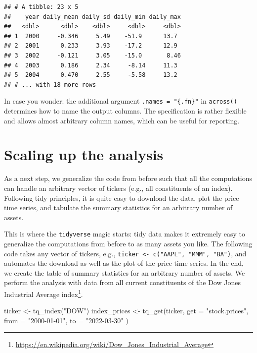 \documentclass[
]{krantz}
\newenvironment{Shaded}{\begin{snugshade}}{\end{snugshade}}
\newcommand{\AttributeTok}[1]{\textcolor[rgb]{0.61,0.61,0.61}{#1}}
\newcommand{\FunctionTok}[1]{\textcolor[rgb]{0,0,0}{#1}}
\newcommand{\NormalTok}[1]{#1}
\newcommand{\OtherTok}[1]{\textcolor[rgb]{0.37,0.37,0.37}{#1}}
\newcommand{\StringTok}[1]{\textcolor[rgb]{0.5,0.5,0.5}{#1}}
\renewcommand{\href}[2]{#2\footnote{\url{#1}}}
\begin{document}
\begin{verbatim}
## # A tibble: 23 x 5
##    year daily_mean daily_sd daily_min daily_max
##   <dbl>      <dbl>    <dbl>     <dbl>     <dbl>
## 1  2000     -0.346     5.49    -51.9      13.7 
## 2  2001      0.233     3.93    -17.2      12.9 
## 3  2002     -0.121     3.05    -15.0       8.46
## 4  2003      0.186     2.34     -8.14     11.3 
## 5  2004      0.470     2.55     -5.58     13.2 
## # ... with 18 more rows
\end{verbatim}

In case you wonder: the additional argument \texttt{.names\ =\ "\{.fn\}"} in \texttt{across()} determines how to name the output columns. The specification is rather flexible and allows almost arbitrary column names, which can be useful for reporting.

\hypertarget{scaling-up-the-analysis}{%
\section{Scaling up the analysis}\label{scaling-up-the-analysis}}

As a next step, we generalize the code from before such that all the computations can handle an arbitrary vector of tickers (e.g., all constituents of an index). Following tidy principles, it is quite easy to download the data, plot the price time series, and tabulate the summary statistics for an arbitrary number of assets.

This is where the \texttt{tidyverse} magic starts: tidy data makes it extremely easy to generalize the computations from before to as many assets you like. The following code takes any vector of tickers, e.g., \texttt{ticker\ \textless{}-\ c("AAPL",\ "MMM",\ "BA")}, and automates the download as well as the plot of the price time series. In the end, we create the table of summary statistics for an arbitrary number of assets. We perform the analysis with data from all current constituents of the \href{https://en.wikipedia.org/wiki/Dow_Jones_Industrial_Average}{Dow Jones Industrial Average index}.

\begin{Shaded}
\begin{Highlighting}[]
\NormalTok{ticker }\OtherTok{\textless{}{-}} \FunctionTok{tq\_index}\NormalTok{(}\StringTok{"DOW"}\NormalTok{)}
\NormalTok{index\_prices }\OtherTok{\textless{}{-}} \FunctionTok{tq\_get}\NormalTok{(ticker,}
  \AttributeTok{get =} \StringTok{"stock.prices"}\NormalTok{,}
  \AttributeTok{from =} \StringTok{"2000{-}01{-}01"}\NormalTok{,}
  \AttributeTok{to =} \StringTok{"2022{-}03{-}30"}
\NormalTok{)}
\end{Highlighting}
\end{Shaded}
\end{document}
